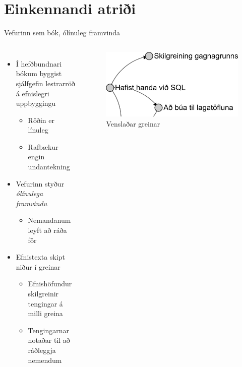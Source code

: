 \documentclass{beamer}
\begin{document}
\section{Einkennandi atriði}

\begin{frame}{Vefurinn sem bók, ólínuleg framvinda}
    \begin{columns}
        \begin{itemize}
            \item Í hefðbundnari bókum byggist sjálfgefin lestrarröð á efnislegri uppbyggingu
            \begin{itemize}
                \item Röðin er línuleg
                \item Rafbækur engin undantekning
            \end{itemize}
            \item Vefurinn styður \emph{ólínulega framvindu}
            \begin{itemize}
                \item Nemandanum leyft að ráða för
            \end{itemize}
            \item Efnistexta skipt niður í greinar
            \begin{itemize}
                \item Efnishöfundur skilgreinir tengingar á milli greina
                \item Tengingarnar notaðar til að ráðleggja nemendum
            \end{itemize}
        \end{itemize}
        \begin{figure}
            \caption{Venslaðar greinar}
            \includegraphics[width=\textwidth]{relational-sections}
        \end{figure}
    \end{columns}
\end{frame}
\end{document}
